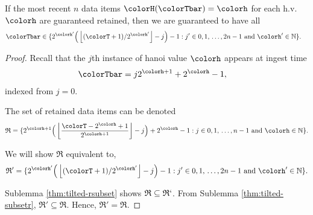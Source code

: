 \begin{lemma}
\label{thm:retained-equivalence-tilted}
If the most recent $n$ data items $\colorH(\colorTbar) = \colorh$ for each h.v. $\colorh$ are guaranteed retained, then we are guaranteed to have all
\begin{align*}
\colorTbar
&\in
\{
  2^{\colorh'}\Big(\left\lfloor (\colorT + 1) / 2^{\colorh'} \right\rfloor - j\Big) - 1
  :
  j' \in 0,1,\,\ldots,2n-1
  \text{ and }
  \colorh' \in \mathbb{N}
\}.
\end{align*}
\end{lemma}
\begin{proof}

Recall that the $j$th instance of hanoi value $\colorh$ appears at ingest time
\begin{align*}
\colorTbar
&= j2^{\colorh + 1} + 2^{\colorh} - 1,
\end{align*}
indexed from $j=0$.

The set of retained data items can be denoted
\begin{align*}
\mathfrak{R} =
\{
  2^{\colorh + 1}\Big( \left\lfloor\frac{\colorT - 2^{\colorh} + 1}{2^{\colorh + 1}} \right\rfloor - j\Big) + 2^{\colorh} - 1
  :
  j \in 0,1,\,\ldots,n-1
  \text{ and }
  \colorh \in \mathbb{N}
\}.
\end{align*}

We will show $\mathfrak{R}$ equivalent to,
\begin{align*}
\mathfrak{R}' =
\{
  2^{\colorh'}\Big(\left\lfloor (\colorT + 1)/ 2^{\colorh'} \right\rfloor - j\Big) - 1
  :
  j' \in 0,1,\,\ldots,2n-1
  \text{ and }
  \colorh' \in \mathbb{N}
\}.
\end{align*}

Sublemma \ref{thm:tilted-rsubset} shows $\mathfrak{R} \subseteq \mathfrak{R}`$.
From Sublemma \ref{thm:tilted-subsetr}, $\mathfrak{R}' \subseteq \mathfrak{R}$.
Hence, $\mathfrak{R}' = \mathfrak{R}$.

\end{proof}

